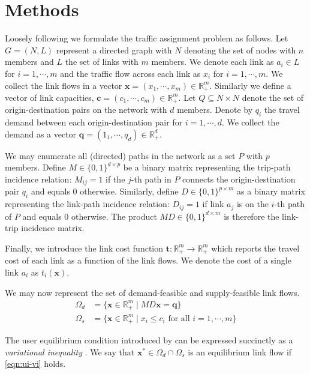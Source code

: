\section{Methods}

Loosely following \citet{smith1979existence} we formulate the traffic assignment problem as follows. Let $G=(N,L)$ represent a directed graph with $N$ denoting the set of nodes with $n$ members and $L$ the set of links with $m$ members. We denote each link as $a_i\in L$ for $i=1,\cdots,m$ and the traffic flow across each link as $x_i$ for $i=1,\cdots,m$. We collect the link flows in a vector $\mathbf{x}=(x_1,\cdots, x_m)\in\mathbb{R}_+^m$. Similarly we define a vector of link capacities, $\mathbf{c}=(c_1, \cdots, c_m)\in \mathbb{R}_+^m$. Let $Q\subseteq N\times N$ denote the set of origin-destination pairs on the network with $d$ members. Denote by $q_i$ the travel demand between each origin-destination pair for $i=1,\cdots,d$. We collect the demand as a vector $\mathbf{q}=(1_1, \cdots, q_d)\in\mathbb{R}_+^d$. 

We may enumerate all (directed) paths in the network as a set $P$ with $p$ members. Define $M \in \{0, 1\}^{d\times p}$ be a binary matrix representing the trip-path incidence relation: $M_{ij} = 1$ if the $j$-th path in $P$ connects the origin-destination pair $q_i$ and equals $0$ otherwise. Similarly, define $D\in \{0, 1\}^{p\times m}$ as a binary matrix representing the link-path incidence relation: $D_{ij}=1$ if link $a_j$ is on the $i$-th path of $P$ and equals $0$ otherwise. The product $MD \in \{0, 1\}^{d \times m}$ is therefore the link-trip incidence matrix.

Finally, we introduce the link cost function $\mathbf{t}: \mathbb{R}_+^m \to \mathbb{R}_+^m$ which reports the travel cost of each link as a function of the link flows. We denote the cost of a single link $a_i$ as $t_i(\mathbf{x})$.

We may now represent the set of demand-feasible and supply-feasible link flows.
\begin{align}
    \Omega_d &= \{\mathbf{x} \in \mathbb{R}_+^m \mid MD\mathbf{x}= \mathbf{q}\}\label{eqn:demand-feasible-link-flow}\\
    \Omega_s &= \{\mathbf{x} \in \mathbb{R}_+^m \mid x_i \leq c_i \text{ for all } i=1,\cdots, m \} \label{eqn:supply-feasible-link-flow}
\end{align}

The user equilibrium condition introduced by \citet{wardrop1952some} can be expressed succinctly as a \textit{variational inequality} \citep{smith1979existence,dafermos1980traffic,nagurney2009netecon}.
We say that $\mathbf{x^*}\in\Omega_d\cap \Omega_s$ is an equilibrium link flow if \eqref{eqn:ui-vi} holds.


